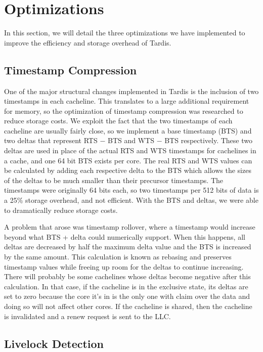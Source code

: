 \documentclass[12pt]{article}
\begin{document}
\section{Optimizations} \label{sec:optimization}

In this section, we will detail the three optimizations we have 
implemented to improve the efficiency and storage overhead of Tardis.

\subsection{Timestamp Compression}

One of the major structural changes implemented in Tardis is the 
inclusion of two timestamps in each cacheline. This translates to a 
large additional requirement for memory, so the optimization of 
timestamp compression was researched to reduce storage costs. We 
exploit the fact that the two timestamps of each cacheline are usually 
fairly close, so we implement a base timestamp (BTS) and two deltas 
that represent RTS $-$ BTS and WTS $-$ BTS respectively. These two 
deltas are used in place of the actual RTS and WTS timestamps for 
cachelines in a cache, and one 64 bit BTS exists per core. The real 
RTS and WTS values can be calculated by adding each respective delta 
to the BTS which allows the sizes of the deltas to be much smaller 
than their precursor timestamps. The timestamps were originally 64 
bits each, so two timestamps per 512 bits of data is a 25\% storage 
overhead, and not efficient.  With the BTS and deltas, we were able to 
dramatically reduce storage costs. 

A problem that arose was timestamp rollover, where a 
timestamp would  increase beyond what BTS + delta could 
numerically support. When this happens, all deltas are decreased by 
half the maximum delta value and the BTS is increased by the same 
amount. This calculation is known as rebasing and preserves timestamp 
values while freeing up room for the deltas to continue increasing.  
There will probably be some cachelines whose deltas become negative 
after this calculation. In that case, if the cacheline is in the 
exclusive state, its deltas are set to zero because the core it's in is the 
only one with claim over the data and doing so will not affect other 
cores. If the cacheline is shared, then the cacheline is invalidated 
and a renew request is sent to the LLC. 

\subsection{Livelock Detection} \label{sec:livelock-detection}
\end{document}
